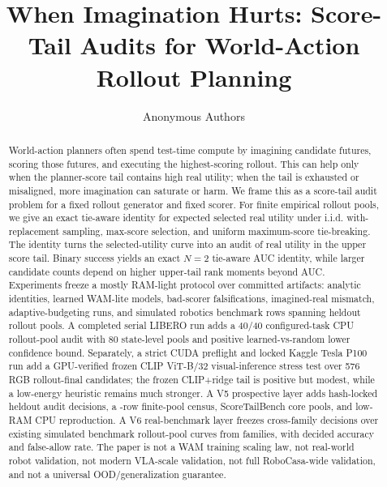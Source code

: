 \documentclass{article}
\title{When Imagination Hurts: Score-Tail Audits for World-Action Rollout Planning}
\author{Anonymous Authors}
\begin{document}
\maketitle

\begin{abstract}
World-action planners often spend test-time compute by imagining candidate futures, scoring those futures, and executing the highest-scoring rollout. This can help only when the planner-score tail contains high real utility; when the tail is exhausted or misaligned, more imagination can saturate or harm. We frame this as a score-tail audit problem for a fixed rollout generator and fixed scorer. For finite empirical rollout pools, we give an exact tie-aware identity for expected selected real utility under i.i.d. with-replacement sampling, max-score selection, and uniform maximum-score tie-breaking. The identity turns the selected-utility curve into an audit of real utility in the upper score tail. Binary success yields an exact $N=2$ tie-aware AUC identity, while larger candidate counts depend on higher upper-tail rank moments beyond AUC. Experiments freeze a mostly RAM-light protocol over committed artifacts: analytic identities, learned WAM-lite models, bad-scorer falsifications, imagined-real mismatch, adaptive-budgeting runs, and \VFourWAMBenchmarkRows{} simulated robotics benchmark rows spanning \VFourWAMBenchmarkPools{} heldout rollout pools. A completed serial LIBERO run adds a 40/40 configured-task CPU rollout-pool audit with 80 state-level pools and positive learned-vs-random lower confidence bound. Separately, a strict CUDA preflight and locked Kaggle Tesla P100 run add a GPU-verified frozen CLIP ViT-B/32 visual-inference stress test over 576 RGB rollout-final candidates; the frozen CLIP+ridge tail is positive but modest, while a low-energy heuristic remains much stronger. A V5 prospective layer adds \VFiveWAMProspectivePools{} hash-locked heldout audit decisions, a \VFiveWAMCensusRows{}-row finite-pool census, ScoreTailBench core pools, and low-RAM CPU reproduction. A V6 real-benchmark layer freezes cross-family decisions over \VSixWAMPools{} existing simulated benchmark rollout-pool curves from \VSixWAMFamilies{} families, with \VSixWAMDecisionAccuracy{} decided accuracy and \VSixWAMFalseAllow{} false-allow rate. The paper is not a WAM training scaling law, not real-world robot validation, not modern VLA-scale validation, not full RoboCasa-wide validation, and not a universal OOD/generalization guarantee.
\end{abstract}
\end{document}
